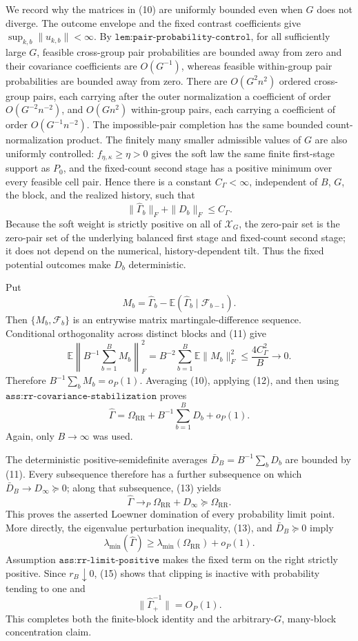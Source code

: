 We record why the matrices in (10) are uniformly bounded even when \(G\) does not diverge.  The outcome envelope and the fixed contrast coefficients give \(\sup_{k,b}\|u_{k,b}\|<\infty\).  By \(\texttt{lem:pair-probability-control}\), for all sufficiently large \(G\), feasible cross-group pair probabilities are bounded away from zero and their covariance coefficients are \(O(G^{-1})\), whereas feasible within-group pair probabilities are bounded away from zero.  There are \(O(G^2n^2)\) ordered cross-group pairs, each carrying after the outer normalization a coefficient of order \(O(G^{-2}n^{-2})\), and \(O(Gn^2)\) within-group pairs, each carrying a coefficient of order \(O(G^{-1}n^{-2})\).  The impossible-pair completion has the same bounded count-normalization product.  The finitely many smaller admissible values of \(G\) are also uniformly controlled: \(f_{\eta,\kappa}\ge\eta>0\) gives the soft law the same finite first-stage support as \(P_0\), and the fixed-count second stage has a positive minimum over every feasible cell pair.  Hence there is a constant \(C_\Gamma<\infty\), independent of \(B\), \(G\), the block, and the realized history, such that
\[
 \|\widehat\Gamma_b\|_F+\|D_b\|_F\le C_\Gamma.           \tag{11}
\]
Because the soft weight is strictly positive on all of \(\mathcal X_G\), the zero-pair set is the zero-pair set of the underlying balanced first stage and fixed-count second stage; it does not depend on the numerical, history-dependent tilt.  Thus the fixed potential outcomes make \(D_b\) deterministic.

Put
\[
 M_b=\widehat\Gamma_b-
     \mathbb E(\widehat\Gamma_b\mid\mathcal F_{b-1}).
\]
Then \(\{M_b,\mathcal F_b\}\) is an entrywise matrix martingale-difference sequence.  Conditional orthogonality across distinct blocks and (11) give
\[
 \mathbb E\left\|B^{-1}\sum_{b=1}^BM_b\right\|_F^2
 =B^{-2}\sum_{b=1}^B\mathbb E\|M_b\|_F^2
 \le\frac{4C_\Gamma^2}{B}\longrightarrow0.                \tag{12}
\]
Therefore \(B^{-1}\sum_bM_b=o_P(1)\).  Averaging (10), applying (12), and then using \(\texttt{ass:rr-covariance-stabilization}\) proves
\[
 \widehat\Gamma
 =\Omega_{\mathrm{RR}}+B^{-1}\sum_{b=1}^BD_b+o_P(1).       \tag{13}
\]
Again, only \(B\to\infty\) was used.

The deterministic positive-semidefinite averages
\(\bar D_B=B^{-1}\sum_bD_b\) are bounded by (11).  Every subsequence therefore has a further subsequence on which \(\bar D_B\to D_\infty\succeq0\); along that subsequence, (13) yields
\[
 \widehat\Gamma\longrightarrow_P
 \Omega_{\mathrm{RR}}+D_\infty\succeq\Omega_{\mathrm{RR}}. \tag{14}
\]
This proves the asserted Loewner domination of every probability limit point.  More directly, the eigenvalue perturbation inequality, (13), and \(\bar D_B\succeq0\) imply
\[
 \lambda_{\min}(\widehat\Gamma)
 \ge\lambda_{\min}(\Omega_{\mathrm{RR}})+o_P(1).          \tag{15}
\]
Assumption \(\texttt{ass:rr-limit-positive}\) makes the fixed term on the right strictly positive.  Since \(r_B\downarrow0\), (15) shows that clipping is inactive with probability tending to one and
\[
 \|\widehat\Gamma_+^{-1}\|=O_P(1).
\]
This completes both the finite-block identity and the arbitrary-\(G\), many-block concentration claim.